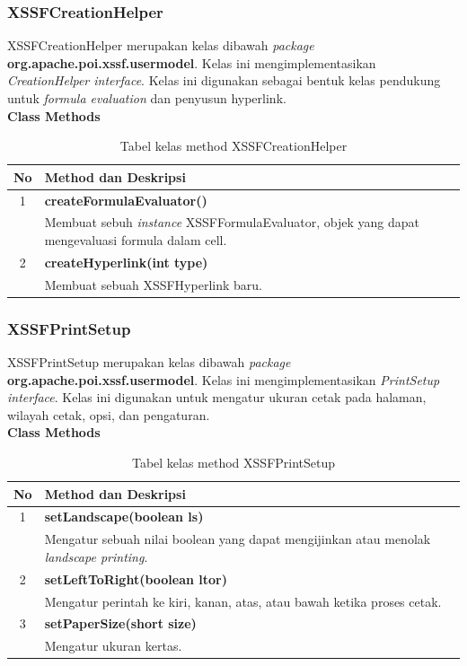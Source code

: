\subsubsection{XSSFCreationHelper}
\label{subs:XSSFCreationHelper}
XSSFCreationHelper merupakan kelas dibawah \textit{package} \textbf{org.apache.poi.xssf.usermodel}. Kelas ini mengimplementasikan \textit{CreationHelper interface}. Kelas ini digunakan sebagai bentuk kelas pendukung untuk \textit{formula evaluation} dan penyusun hyperlink.\cite{apachepoi2}
\\
\noindent \textbf{Class Methods}
\begin{table}[H]
		\centering
		\caption{Tabel kelas method XSSFCreationHelper}
		\label{tab:methodXSSFCreationHelper}
	\begin{tabular}{|c|p{12cm}|}
		\hline
		\textbf{No} & \textbf{Method dan Deskripsi} \\ \hline \hline
		1 & \textbf{createFormulaEvaluator()}\\
			&	Membuat sebuh \textit{instance} XSSFFormulaEvaluator, objek yang dapat mengevaluasi formula dalam cell.\\ \hline
		2 & \textbf{createHyperlink(int type)}\\
			&	Membuat sebuah XSSFHyperlink baru.\\ \hline
	\end{tabular}
\end{table}

\subsubsection{XSSFPrintSetup}
\label{subs:XSSFPrintSetup}
XSSFPrintSetup merupakan kelas dibawah \textit{package} \textbf{org.apache.poi.xssf.usermodel}. Kelas ini mengimplementasikan \textit{PrintSetup interface}. Kelas ini digunakan untuk mengatur ukuran cetak pada halaman, wilayah cetak, opsi, dan pengaturan.\cite{apachepoi2}
\\
\noindent \textbf{Class Methods}
\begin{table}[H]
		\centering
		\caption{Tabel kelas method XSSFPrintSetup}
		\label{tab:methodXSSFPrintSetup}
	\begin{tabular}{|c|p{12cm}|}
		\hline
		\textbf{No} & \textbf{Method dan Deskripsi} \\ \hline \hline
		1 & \textbf{setLandscape(boolean ls)}\\
			&	Mengatur sebuah nilai boolean yang dapat mengijinkan atau menolak \textit{landscape printing}.\\ \hline
		2 & \textbf{setLeftToRight(boolean ltor)}\\
			&	Mengatur perintah ke kiri, kanan, atas, atau bawah ketika proses cetak.\\ \hline
		3 & \textbf{setPaperSize(short size)}\\
			&	Mengatur ukuran kertas.\\ \hline
	\end{tabular}
\end{table}
	
